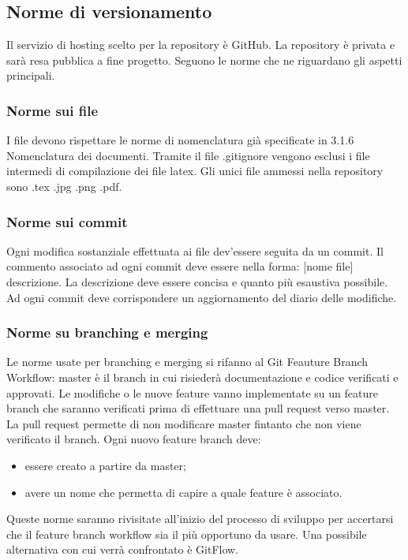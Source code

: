 \subsection{Norme di versionamento}
Il servizio di hosting scelto per la repository è GitHub. La repository è
privata e sarà resa pubblica a fine progetto. Seguono le norme che ne riguardano gli aspetti
principali.
\subsubsection{Norme sui file}
I file devono rispettare le norme di nomenclatura già specificate in 3.1.6 Nomenclatura dei documenti.
Tramite il file .gitignore vengono esclusi i file intermedi di compilazione dei file latex.
Gli unici file ammessi nella repository sono .tex .jpg .png .pdf.

\subsubsection{Norme sui commit}
Ogni modifica sostanziale effettuata ai file dev'essere seguita da un commit. Il commento associato ad ogni commit deve essere nella forma: [nome file] descrizione.
La descrizione deve essere concisa e quanto più esaustiva possibile. Ad ogni commit deve corrispondere un aggiornamento del diario delle modifiche.

\subsubsection{Norme su branching e merging}
Le norme usate per branching e merging si rifanno al Git Feauture Branch Workflow:
master è il branch in cui risiederà documentazione e codice verificati e approvati.
Le modifiche o le nuove feature vanno implementate su un feature branch che saranno verificati
prima di effettuare una pull request verso master.
La pull request permette di non modificare master fintanto che non viene verificato il branch.
Ogni nuovo feature branch deve:
\begin{itemize}
\item essere creato a partire da master;
\item avere un nome che permetta di capire a quale feature è associato.
\end{itemize}
Queste norme saranno rivisitate all'inizio del processo di sviluppo per accertarsi che il feature branch workflow sia il più opportuno da usare. Una possibile alternativa con cui verrà confrontato è GitFlow.

